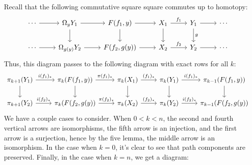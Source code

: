 \documentclass[11pt,letterpaper]{article}
\begin{document}
\begin{solution}
    \quad Recall that the following commutative square square commutes up to homotopy:
    \[\begin{tikzcd}
        \cdots & {\Omega_yY_1} & {F(f_1,y)} & {X_1} & {Y_1} & \cdots \\
        \cdots & {\Omega_{g(y)}Y_2} & {F(f_2,g(y))} & {X_2} & {Y_2} & \cdots
        \arrow[from=2-3, to=2-4]
        \arrow["{f_2}", from=2-4, to=2-5]
        \arrow["{f_1}", from=1-4, to=1-5]
        \arrow[from=1-3, to=1-4]
        \arrow[from=1-3, to=2-3]
        \arrow[from=1-4, to=2-4]
        \arrow["g", from=1-5, to=2-5]
        \arrow[from=1-2, to=1-3]
        \arrow[from=2-2, to=2-3]
        \arrow[from=1-5, to=1-6]
        \arrow[from=2-5, to=2-6]
        \arrow[from=1-1, to=1-2]
        \arrow[from=2-1, to=2-2]
        \arrow[from=1-2, to=2-2]
    \end{tikzcd}\]
    Thus, this diagram passes to the following diagram with exact rows for all $k$:
\[\begin{tikzcd}
	{\pi_{k+1}(Y_1)} & {\pi_k(F(f_1,y))} & {\pi_k(X_1)} & {\pi_k(Y_1)} & {\pi_{k-1}(F(f_1,y))} \\
	{\pi_{k+1}(Y_2)} & {\pi_k(F(f_2,g(y))} & {\pi_k(X_2)} & {\pi_k(Y_2)} & {\pi_{k-1}(F(f_2,g(y))}
	\arrow["{(f_2)_*}", from=2-3, to=2-4]
	\arrow["{\pi(f_1)_*}", from=1-2, to=1-3]
	\arrow["{\pi(f_2)_*}", from=2-2, to=2-3]
	\arrow["{i(f_2)_*}", from=2-4, to=2-5]
	\arrow["{i(f_2)_*}", from=2-1, to=2-2]
	\arrow["{i(f_1)_*}", from=1-1, to=1-2]
	\arrow[from=1-3, to=2-3]
	\arrow["{(f_1)_*}", from=1-3, to=1-4]
	\arrow[from=1-4, to=2-4]
	\arrow[from=1-2, to=2-2]
	\arrow[from=1-1, to=2-1]
	\arrow["{i(f_1)_*}", from=1-4, to=1-5]
	\arrow[from=1-5, to=2-5]
\end{tikzcd}\]
\quad We have a couple cases to consider. When $0<k<n$, the second and fourth vertical arrows are isomorphisms, the fifth arrow is an injection, and the first arrow is a surjection, hence by the five lemma, the middle arrow is an isomorphism. In the case when $k=0$, it's clear to see that path components are preserved. Finally, in the case when $k=n$, we get a diagram:

\end{solution}
\end{document}
